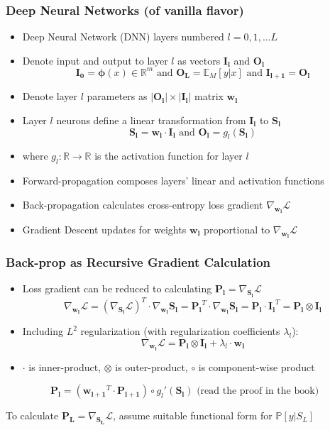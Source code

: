\documentclass{beamer}
\begin{document}
\begin{frame}
\frametitle{Deep Neural Networks (of vanilla flavor)}
\pause
\begin{itemize}[<+->]
\item Deep Neural Network (DNN) layers numbered $l = 0, 1, \ldots L$
\item Denote input and output to layer $l$ as vectors $\bm{I_l}$ and $\bm{O_l}$
$$\bm{I_0} = \bm{\phi}(x) \in \mathbb{R}^m \text{ and } \bm{O_L} = \mathbb{E}_M[y|x] \text{ and } \bm{I_{l+1}} = \bm{O_l}$$
\item Denote layer $l$ parameters as $|\bm{O_l}| \times |\bm{I_l}|$ matrix $\bm{w_l}$
\item Layer $l$ neurons define a linear transformation from $\bm{I_l}$ to $\bm{S_l}$
$$\bm{S_l} = \bm{w_l} \cdot \bm{I_l} \text{ and } \bm{O_l} = g_l(\bm{S_l})$$
\item where $g_l: \mathbb{R} \rightarrow \mathbb{R}$ is the activation function for layer $l$
\item Forward-propagation composes layers' linear and activation functions
\item Back-propagation calculates cross-entropy loss gradient $\nabla_{\bm{w_l}} \mathcal{L}$
\item Gradient Descent updates for weights $\bm{w_l}$ proportional to $\nabla_{\bm{w_l}} \mathcal{L}$
\end{itemize}
\end{frame}

\begin{frame}
\frametitle{Back-prop as Recursive Gradient Calculation}
\pause
\begin{itemize}[<+->]
\item Loss gradient can be reduced to calculating $\bm{P_l} = \nabla_{\bm{S_l}} \mathcal{L}$
$$\nabla_{\bm{w_l}} \mathcal{L} = (\nabla_{\bm{S_l}} \mathcal{L})^T \cdot \nabla_{\bm{w_l}} \bm{S_l} = \bm{P_l}^T \cdot \nabla_{\bm{w_l}} \bm{S_l} = \bm{P_l} \cdot \bm{I_l}^T = \bm{P_l} \otimes \bm{I_l}$$
\item Including $L^2$ regularization (with regularization coefficients $\lambda_l$):
$$\nabla_{\bm{w_l}} \mathcal{L} = \bm{P_l} \otimes \bm{I_l} + \lambda_l \cdot \bm{w_l} $$
\item $\cdot$ is inner-product, $\otimes$ is outer-product, $\circ$ is component-wise product
\end{itemize}
\pause
\begin{theorem}
$$\bm{P_l} = (\bm{w_{l+1}}^T \cdot \bm{P_{l+1}}) \circ g_l'(\bm{S_l}) \text{ (read the proof in the book)}$$
\end{theorem}
\pause
To calculate $\bm{P_L} = \nabla_{\bm{S_L}} \mathcal{L}$, assume suitable functional form for $\mathbb{P}[y|S_L]$
\end{frame}
\end{document}
